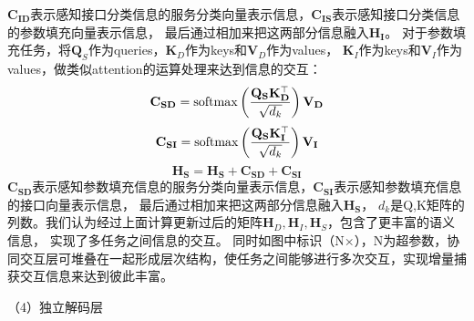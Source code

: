 $\mathbf{C}_{\mathbf{ID}}$表示感知接口分类信息的服务分类向量表示信息，$\mathbf{C}_{\mathbf{IS}}$表示感知接口分类信息的参数填充向量表示信息，
最后通过相加来把这两部分信息融入$\mathbf{H}_\mathbf{I}$。
对于参数填充任务，将$\mathbf{Q}_{S}$作为queries，$\mathbf{K}_{D}$作为keys和$\mathbf{V}_{D}$作为values，
$\mathbf{K}_{I}$作为keys和$\mathbf{V}_{I}$作为values，做类似attention的运算处理来达到信息的交互：
\begin{equation}
  \mathbf{C}_{\mathbf{SD}}=\operatorname{softmax}\left(\frac{\mathbf{Q}_{\mathbf{S}} \mathbf{K}_{\mathbf{D}}^{\top}}{\sqrt{d_{k}}}\right) \mathbf{V}_{\mathbf{D}}\\
\end{equation}
\begin{equation}
  \mathbf{C}_{\mathbf{SI}}=\operatorname{softmax}\left(\frac{\mathbf{Q}_{\mathbf{S}} \mathbf{K}_{\mathbf{I}}^{\top}}{\sqrt{d_{k}}}\right) \mathbf{V}_{\mathbf{I}}\\
\end{equation}
\begin{equation}
  \mathbf{H}_\mathbf{S}=\mathbf{H}_\mathbf{S}+\mathbf{C}_{\mathbf{SD}}+\mathbf{C}_{\mathbf{SI}}
\end{equation}
$\mathbf{C}_{\mathbf{SD}}$表示感知参数填充信息的服务分类向量表示信息，$\mathbf{C}_{\mathbf{SI}}$表示感知参数填充信息的接口向量表示信息，
最后通过相加来把这两部分信息融入$\mathbf{H}_\mathbf{S}$，
$d_k$是Q,K矩阵的列数。我们认为经过上面计算更新过后的矩阵$\mathbf{H}_{D},\mathbf{H}_{I},\mathbf{H}_{S}$，包含了更丰富的语义信息，
实现了多任务之间信息的交互。
同时如图中标识（N×），N为超参数，协同交互层可堆叠在一起形成层次结构，使任务之间能够进行多次交互，实现增量捕获交互信息来达到彼此丰富。

（4）独立解码层

